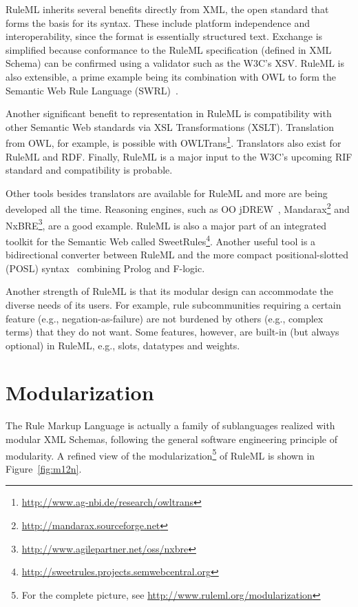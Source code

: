 \documentclass[12pt]{report}
\begin{document}
RuleML inherits several benefits directly from XML, the open standard that forms the basis for its syntax. These include platform independence and interoperability, since the format is essentially structured text. Exchange is simplified because conformance to the RuleML specification (defined in XML Schema) can be confirmed using a validator such as the W3C's XSV. RuleML is also extensible, a prime example being its combination with OWL to form the Semantic Web Rule Language (SWRL)~\cite{swrl}.

Another significant benefit to representation in RuleML is compatibility with other Semantic Web standards via XSL Transformations (XSLT). Translation from OWL, for example, is possible with OWLTrans\footnote{\url{http://www.ag-nbi.de/research/owltrans}}. Translators also exist for RuleML and RDF. Finally, RuleML is a major input to the W3C's upcoming RIF standard and compatibility is probable.

Other tools besides translators are available for RuleML and more are being developed all the time. Reasoning engines, such as OO jDREW~\cite{ball}, Mandarax\footnote{\url{http://mandarax.sourceforge.net}} and NxBRE\footnote{\url{http://www.agilepartner.net/oss/nxbre}}, are a good example. RuleML is also a major part of an integrated toolkit for the Semantic Web called SweetRules\footnote{\url{http://sweetrules.projects.semwebcentral.org}}.
Another useful tool is a bidirectional converter between RuleML and the more compact positional-slotted (POSL) syntax~\cite{posl} combining Prolog and F-logic.

Another strength of RuleML is that its modular design can accommodate the diverse needs of its users. For example, rule subcommunities requiring a certain feature (e.g., negation-as-failure) are not burdened by others (e.g., complex terms) that they do not want. Some features, however, are built-in (but always optional) in RuleML, e.g., slots, datatypes and weights.

\section{Modularization}

The Rule Markup Language is actually a family of sublanguages realized with modular XML Schemas, following the general software engineering principle of modularity. A refined view of the modularization\footnote{For the complete picture, see \url{http://www.ruleml.org/modularization}} of RuleML is shown in Figure~\ref*{fig:m12n}.
\end{document}
